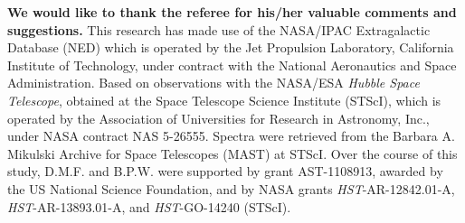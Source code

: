 \documentclass[twocolumn,tighten]{aastex6}
\begin{document}
\acknowledgements

\textbf{We would like to thank the referee for his/her valuable comments and suggestions.} This research has made use of the NASA/IPAC Extragalactic Database (NED) which is operated by the Jet Propulsion Laboratory, California Institute of Technology, under contract with the National Aeronautics and Space Administration. Based on observations with the NASA/ESA \textit{Hubble Space Telescope}, obtained at the Space Telescope Science Institute (STScI), which is operated by the Association of Universities for Research in Astronomy, Inc., under NASA contract NAS 5-26555. Spectra were retrieved from the Barbara A. Mikulski Archive for Space Telescopes (MAST) at STScI. Over the course of this study, D.M.F. and B.P.W. were supported by grant AST-1108913, awarded by the US National Science Foundation, and by NASA grants \textit{HST}-AR-12842.01-A, \textit{HST}-AR-13893.01-A, and \textit{HST}-GO-14240 (STScI).



\nocite{*}


\end{document}
